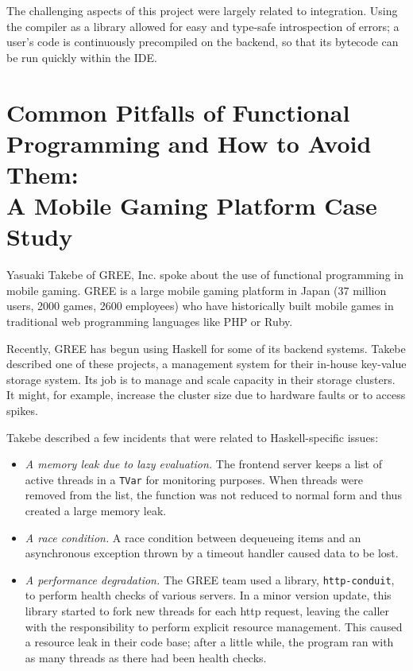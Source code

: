 \documentclass{jfp1}
\begin{document}
The challenging aspects of this project were largely related
to integration. Using the compiler as a library allowed for easy
and type-safe introspection of errors; a user's code is continuously
precompiled on the backend, so that its bytecode can be run
quickly within the IDE.

\section{Common Pitfalls of Functional Programming and How 
to Avoid Them:\\ A Mobile Gaming Platform Case Study}


Yasuaki Takebe of GREE, Inc. spoke about the use of functional
programming in mobile gaming. GREE is a large mobile gaming
platform in Japan (37 million users, 2000 games, 
2600 employees) who have historically built mobile games in
traditional web programming languages like PHP or Ruby.

Recently, GREE has begun using Haskell for some of its backend
systems. Takebe described one of these projects, a management system
for their in-house key-value storage system. Its job is to manage and
scale capacity in their storage clusters. It might, for example,
increase the cluster size due to hardware faults or to access spikes.

Takebe described a few incidents that were related to Haskell-specific
issues:

\begin{itemize}

\item \textit{A memory leak due to lazy evaluation.} The frontend
server keeps a list of active threads in a \texttt{TVar} for
monitoring purposes. When threads were removed from the list, the
function was not reduced to normal form and thus created a large
memory leak.

\item \textit{A race condition.} A race condition between dequeueing
items and an asynchronous exception thrown by a timeout handler caused
data to be lost. 

\item \textit{A performance degradation.} The GREE team used a
library, \texttt{http-conduit}, to perform health checks of various
servers. In a minor version update, this library started to fork new
threads for each http request, leaving the caller with the
responsibility to perform explicit resource management. This caused
a resource leak in their code base; after a little while, the program ran
with as many threads as there had been health checks.

\end{itemize}
\end{document}

